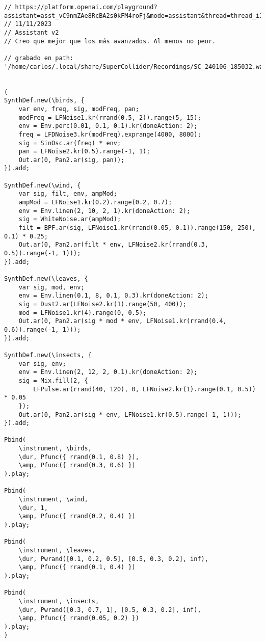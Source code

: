 \begin{minipage}[t]{1\textwidth}
    \centering
    \begin{lstlisting}[style=SuperCollider-IDE, basicstyle=\footnotesize\ttfamily, numbers=none]
// https://platform.openai.com/playground?assistant=asst_vC9nmZAe8RcBA2s0kFM4roFj&mode=assistant&thread=thread_i1XHLNH57r1duSZU5x7nWn5h
// 11/11/2023
// Assistant v2
// Creo que mejor que los más avanzados. Al menos no peor.

// grabado en path: '/home/carlos/.local/share/SuperCollider/Recordings/SC_240106_185032.wav'


(
SynthDef.new(\birds, {
    var env, freq, sig, modFreq, pan;
    modFreq = LFNoise1.kr(rrand(0.5, 2)).range(5, 15);
    env = Env.perc(0.01, 0.1, 0.1).kr(doneAction: 2);
    freq = LFDNoise3.kr(modFreq).exprange(4000, 8000);
    sig = SinOsc.ar(freq) * env;
    pan = LFNoise2.kr(0.5).range(-1, 1);
    Out.ar(0, Pan2.ar(sig, pan));
}).add;

SynthDef.new(\wind, {
    var sig, filt, env, ampMod;
    ampMod = LFNoise1.kr(0.2).range(0.2, 0.7);
    env = Env.linen(2, 10, 2, 1).kr(doneAction: 2);
    sig = WhiteNoise.ar(ampMod);
    filt = BPF.ar(sig, LFNoise1.kr(rrand(0.05, 0.1)).range(150, 250), 0.1) * 0.25;
    Out.ar(0, Pan2.ar(filt * env, LFNoise2.kr(rrand(0.3, 0.5)).range(-1, 1)));
}).add;

SynthDef.new(\leaves, {
    var sig, mod, env;
    env = Env.linen(0.1, 8, 0.1, 0.3).kr(doneAction: 2);
    sig = Dust2.ar(LFNoise2.kr(1).range(50, 400));
    mod = LFNoise1.kr(4).range(0, 0.5);
    Out.ar(0, Pan2.ar(sig * mod * env, LFNoise1.kr(rrand(0.4, 0.6)).range(-1, 1)));
}).add;

SynthDef.new(\insects, {
    var sig, env;
    env = Env.linen(2, 12, 2, 0.1).kr(doneAction: 2);
    sig = Mix.fill(2, {
        LFPulse.ar(rrand(40, 120), 0, LFNoise2.kr(1).range(0.1, 0.5)) * 0.05
    });
    Out.ar(0, Pan2.ar(sig * env, LFNoise1.kr(0.5).range(-1, 1)));
}).add;

Pbind(
    \instrument, \birds,
    \dur, Pfunc({ rrand(0.1, 0.8) }),
    \amp, Pfunc({ rrand(0.3, 0.6) })
).play;

Pbind(
    \instrument, \wind,
    \dur, 1,
    \amp, Pfunc({ rrand(0.2, 0.4) })
).play;

Pbind(
    \instrument, \leaves,
    \dur, Pwrand([0.1, 0.2, 0.5], [0.5, 0.3, 0.2], inf),
    \amp, Pfunc({ rrand(0.1, 0.4) })
).play;

Pbind(
    \instrument, \insects,
    \dur, Pwrand([0.3, 0.7, 1], [0.5, 0.3, 0.2], inf),
    \amp, Pfunc({ rrand(0.05, 0.2) })
).play;
)                                       
    \end{lstlisting}
    \vspace{1cm}
\end{minipage}


